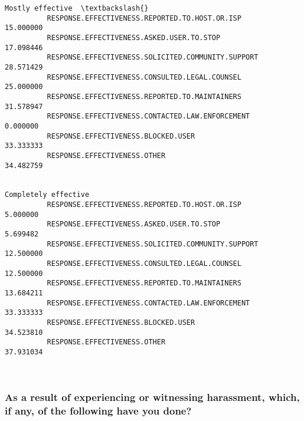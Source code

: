 \documentclass[11pt]{article}
\begin{document}
\begin{Verbatim}[commandchars=\\\{\}]
                                                              Mostly effective  \textbackslash{}
          RESPONSE.EFFECTIVENESS.REPORTED.TO.HOST.OR.ISP             15.000000   
          RESPONSE.EFFECTIVENESS.ASKED.USER.TO.STOP                  17.098446   
          RESPONSE.EFFECTIVENESS.SOLICITED.COMMUNITY.SUPPORT         28.571429   
          RESPONSE.EFFECTIVENESS.CONSULTED.LEGAL.COUNSEL             25.000000   
          RESPONSE.EFFECTIVENESS.REPORTED.TO.MAINTAINERS             31.578947   
          RESPONSE.EFFECTIVENESS.CONTACTED.LAW.ENFORCEMENT            0.000000   
          RESPONSE.EFFECTIVENESS.BLOCKED.USER                        33.333333   
          RESPONSE.EFFECTIVENESS.OTHER                               34.482759   
          
                                                              Completely effective  
          RESPONSE.EFFECTIVENESS.REPORTED.TO.HOST.OR.ISP                  5.000000  
          RESPONSE.EFFECTIVENESS.ASKED.USER.TO.STOP                       5.699482  
          RESPONSE.EFFECTIVENESS.SOLICITED.COMMUNITY.SUPPORT             12.500000  
          RESPONSE.EFFECTIVENESS.CONSULTED.LEGAL.COUNSEL                 12.500000  
          RESPONSE.EFFECTIVENESS.REPORTED.TO.MAINTAINERS                 13.684211  
          RESPONSE.EFFECTIVENESS.CONTACTED.LAW.ENFORCEMENT               33.333333  
          RESPONSE.EFFECTIVENESS.BLOCKED.USER                            34.523810  
          RESPONSE.EFFECTIVENESS.OTHER                                   37.931034  
\end{Verbatim}
        

    \begin{center}
    \end{center}
    { \hspace*{\fill} \\}
    
    \subsubsection{As a result of experiencing or witnessing harassment,
which, if any, of the following have you
done?}\label{as-a-result-of-experiencing-or-witnessing-harassment-which-if-any-of-the-following-have-you-done}
\end{document}
